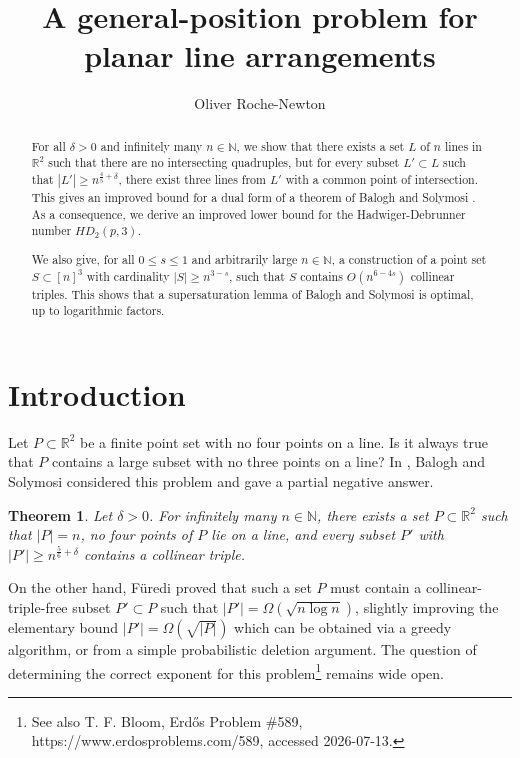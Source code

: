 \documentclass[11pt]{amsart}
\title{A general-position problem for planar line arrangements}
\author{Oliver Roche-Newton}
\newtheorem{theorem}{Theorem}
\theoremstyle{remark}
\begin{document}
\begin{abstract}
For all $\delta>0$ and infinitely many $n \in \mathbb N$, we show that there exists a set $L$ of $n$ lines in $\mathbb R^2$ such that there are no intersecting quadruples, but for every subset $L' \subset L$ such that $|L'| \geq n^{\frac{4}{5}+\delta}$, there exist three lines from $L'$ with a common point of intersection. This gives an improved bound for a dual form of a theorem of Balogh and Solymosi \cite{BaSo}. As a consequence, we derive an improved lower bound for the Hadwiger-Debrunner number $HD_2(p,3)$.

We also give, for all $0 \leq s \leq 1$ and arbitrarily large $n \in \mathbb N$, a construction of a point set $S \subset [n]^3$ with cardinality $|S|\geq n^{3-s}$, such that $S$ contains $O(n^{6-4s})$ collinear triples. This shows that a supersaturation lemma of Balogh and Solymosi \cite{BaSo} is optimal, up to logarithmic factors.
\end{abstract}

\maketitle

\section{Introduction}

Let $P \subset \mathbb R^2$ be a finite point set with no four points on a line. Is it always true that $P$ contains a large subset with no three points on a line?  In  \cite{BaSo}, Balogh and Solymosi considered this problem and gave a partial negative answer. 

\begin{theorem} \label{thm:BS}
Let $\delta >0$. For infinitely many $n \in \mathbb N$, there exists a set $P \subset \mathbb R^2$ such that $|P|=n$, no four points of $P$ lie on a line, and every subset $P'$ with $|P'| \geq n^{\frac{5}{6}+ \delta}$ contains a collinear triple.
\end{theorem} 

On the other hand, Füredi \cite{Fu} proved that such a set $P$ must contain a collinear-triple-free subset $P' \subset P$ such that $|P'| =\Omega(\sqrt {n \log n})$, slightly improving the elementary bound $|P'| =\Omega( \sqrt {|P|})$ which can be obtained via a greedy algorithm, or from a simple probabilistic deletion argument. The question of determining the correct exponent for this problem\footnote{See also T. F. Bloom, Erdős Problem \#589, https://www.erdosproblems.com/589, accessed 2026-07-13.} remains wide open.
\end{document}
